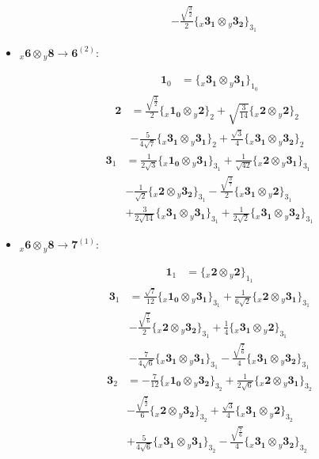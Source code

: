 \documentclass[english]{article}
\newcommand{\rep}[1]{\mathbf{#1}}
\newcommand{\repx}[2]{{}_{#2}\mathbf{#1}}
\newcommand{\tsprodx}[2]{\repx{#1}{x}\otimes\repx{#2}{y}}
\newcommand{\subcgs}[3]{\big\{ \tsprodx{#1}{#2}\big\}^{}_{#3}}
\begin{document}
\begin{itemize}
\begin{fleqn}
\begin{align*}
 & -\frac{\sqrt{\frac{3}{2}}}{2}\subcgs{3_{1}}{3_{2}}{3_{1}}
\end{align*}
\end{fleqn}
\item $\tsprodx{6}{8}\to\rep{6}^{(2)}$:
\begin{fleqn}
\begin{align*}
\rep{1}_{0} & = \subcgs{3_{1}}{3_{1}}{1_{0}}
\end{align*}
\begin{align*}
\rep{2} & = \frac{\sqrt{\frac{3}{2}}}{2}\subcgs{1_{0}}{2}{2}+\sqrt{\frac{3}{14}}\subcgs{2}{2}{2} \\ 
 & -\frac{5}{4 \sqrt{7}}\subcgs{3_{1}}{3_{1}}{2}+\frac{\sqrt{3}}{4}\subcgs{3_{1}}{3_{2}}{2}
\end{align*}
\begin{align*}
\rep{3}_{1} & = \frac{1}{2 \sqrt{3}}\subcgs{1_{0}}{3_{1}}{3_{1}}+\frac{1}{\sqrt{42}}\subcgs{2}{3_{1}}{3_{1}} \\ 
 & -\frac{1}{\sqrt{2}}\subcgs{2}{3_{2}}{3_{1}}-\frac{\sqrt{\frac{3}{7}}}{2}\subcgs{3_{1}}{2}{3_{1}} \\ 
 & +\frac{3}{2 \sqrt{14}}\subcgs{3_{1}}{3_{1}}{3_{1}}+\frac{1}{2 \sqrt{2}}\subcgs{3_{1}}{3_{2}}{3_{1}}
\end{align*}
\end{fleqn}
\item $\tsprodx{6}{8}\to\rep{7}^{(1)}$:
\begin{fleqn}
\begin{align*}
\rep{1}_{1} & = \subcgs{2}{2}{1_{1}}
\end{align*}
\begin{align*}
\rep{3}_{1} & = \frac{\sqrt{7}}{12}\subcgs{1_{0}}{3_{1}}{3_{1}}+\frac{1}{6 \sqrt{2}}\subcgs{2}{3_{1}}{3_{1}} \\ 
 & -\frac{\sqrt{\frac{7}{6}}}{2}\subcgs{2}{3_{2}}{3_{1}}+\frac{1}{4}\subcgs{3_{1}}{2}{3_{1}} \\ 
 & -\frac{7}{4 \sqrt{6}}\subcgs{3_{1}}{3_{1}}{3_{1}}-\frac{\sqrt{\frac{7}{6}}}{4}\subcgs{3_{1}}{3_{2}}{3_{1}}
\end{align*}
\begin{align*}
\rep{3}_{2} & = -\frac{7}{12}\subcgs{1_{0}}{3_{2}}{3_{2}}+\frac{1}{2 \sqrt{6}}\subcgs{2}{3_{1}}{3_{2}} \\ 
 & -\frac{\sqrt{\frac{7}{2}}}{6}\subcgs{2}{3_{2}}{3_{2}}+\frac{\sqrt{3}}{4}\subcgs{3_{1}}{2}{3_{2}} \\ 
 & +\frac{5}{4 \sqrt{6}}\subcgs{3_{1}}{3_{1}}{3_{2}}-\frac{\sqrt{\frac{7}{6}}}{4}\subcgs{3_{1}}{3_{2}}{3_{2}}
\end{align*}

\end{fleqn}
\end{itemize}
\end{document}
